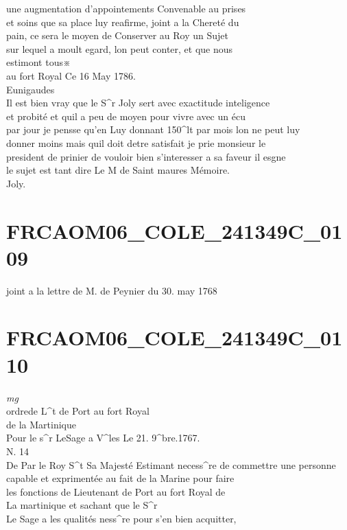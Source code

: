 \documentclass{article}
\begin{document}
\begin{pages}
une augmentation d'appointements Convenable au prises\\
et soins que sa place luy reafirme, joint a la Chereté du\\
pain, ce sera le moyen de Conserver au Roy un Sujet\\
sur lequel a moult egard, lon peut conter, et que nous\\
estimont tous※\\
au fort Royal Ce 16 May 1786.\\
Eunigaudes\\
Il est bien vray que le S\^{}r Joly sert avec exactitude inteligence\\
et probité et quil a peu de moyen pour vivre avec un écu\\
par jour je pensse qu'en Luy donnant 150\^{}lt par mois lon ne peut luy\\
donner moins mais quil doit detre satisfait je prie monsieur le\\
president de prinier de vouloir bien s'interesser a sa faveur il esgne\\
le sujet est tant dire Le M de Saint maures
\pend\pstart
Mémoire.\\
Joly.
\pend
\endnumbering\beginnumbering\section{FRCAOM06\_COLE\_241349C\_0109}\pstart
joint a la lettre de M. de Peynier du 30. may 1768
\pend
\endnumbering\beginnumbering\section{FRCAOM06\_COLE\_241349C\_0110}
\vspace{0.5cm}\noindent
\textit{mg}
\footnotesize \\
ordrede L\^{}t de Port au fort Royal\\
de la Martinique\\
Pour le s\^{}r LeSage
\normalsize \pstart
a V\^{}les Le 21. 9\^{}bre.1767.\\
N. 14\\
De Par le Roy
\pend\pstart
S\^{}t Sa Majesté Estimant necess\^{}re de commettre une personne\\
capable et exprimentée au fait de la Marine pour faire\\
les fonctions de Lieutenant de Port au fort Royal de\\
La martinique et sachant que le S\^{}r\\
Le Sage a les qualités ness\^{}re pour s'en bien acquitter,\\

\end{pages}
\end{document}
